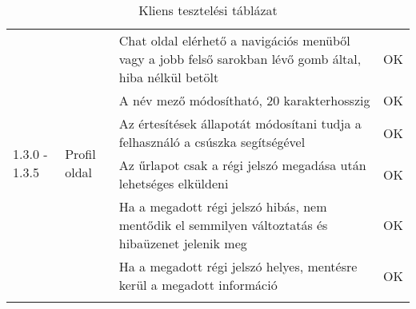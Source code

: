 \begin{center}
\begin{longtable}{ | p{} | p{} | p{} | p{} | }
			\multirow{6}{=}{1.3.0 - 1.3.5} 
			& \multirow{6}{=}{Profil oldal}
			& Chat oldal elérhető a navigációs menüből vagy a jobb felső sarokban lévő gomb által, hiba nélkül betölt
			& OK \\
			\cline{3-4}
			& & A név mező módosítható, 20 karakterhosszig
			& OK \\
			\cline{3-4}
			& & Az értesítések állapotát módosítani tudja a felhasználó a csúszka segítségével
			& OK \\
			\cline{3-4}
			& & Az űrlapot csak a régi jelszó megadása után lehetséges elküldeni
			& OK \\
			\cline{3-4}
			& & Ha a megadott régi jelszó hibás, nem mentődik el semmilyen változtatás és hibaüzenet jelenik meg
			& OK \\
			\cline{3-4}
			& & Ha a megadott régi jelszó helyes, mentésre kerül a megadott információ
			& OK \\
			\hline

			\caption{Kliens tesztelési táblázat}
			\label{tab:testkliens}       
	\end{longtable}
\end{center}

\pagebreak


